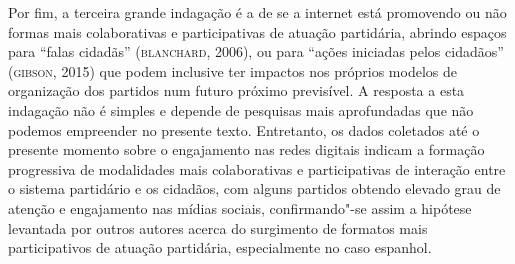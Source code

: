 Por fim, a terceira grande indagação é a de se a internet está
promovendo ou não formas mais colaborativas e participativas de atuação
partidária, abrindo espaços para ``falas cidadãs'' (\textsc{blanchard}, 2006), ou
para ``ações iniciadas pelos cidadãos'' (\textsc{gibson}, 2015) que podem
inclusive ter impactos nos próprios modelos de organização dos partidos
num futuro próximo previsível. A resposta a esta indagação não é simples
e depende de pesquisas mais aprofundadas que não podemos empreender no
presente texto. Entretanto, os dados coletados até o presente momento
sobre o engajamento nas redes digitais indicam a formação progressiva de
modalidades mais colaborativas e participativas de interação entre o
sistema partidário e os cidadãos, com alguns partidos obtendo elevado
grau de atenção e engajamento nas mídias sociais, confirmando"-se assim a
hipótese levantada por outros autores acerca do surgimento de formatos
mais participativos de atuação partidária, especialmente no caso
espanhol.


